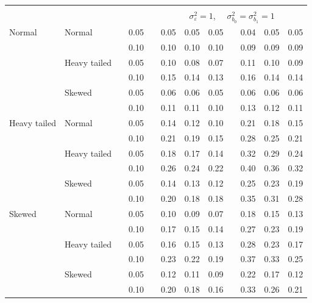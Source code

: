 \documentclass[12pt]{article} %
\begin{document}
\begin{table}[ht]
\begin{scriptsize}
\begin{center}
\begin{tabular}{ll p{.1cm} c p{.1cm} rrr p{.1cm} rrr}
&&&&&&&&&&&\\
& && && \multicolumn{7}{c}{$\sigma_{\varepsilon}^2 = 1$, \ \ $\sigma_{b_0}^2 = \sigma_{b_1}^2 = 1$} \\ \cline{6-12}
Normal       & Normal       && 0.05 &&  0.05 & 0.05 & 0.05 && 0.04 & 0.05 & 0.05 \\ 
             &              && 0.10 &&  0.10 & 0.10 & 0.10 && 0.09 & 0.09 & 0.09 \\ 
             & Heavy tailed && 0.05 &&  0.10 & 0.08 & 0.07 && 0.11 & 0.10 & 0.09 \\ 
             &              && 0.10 &&  0.15 & 0.14 & 0.13 && 0.16 & 0.14 & 0.14 \\ 
             & Skewed       && 0.05 &&  0.06 & 0.06 & 0.05 && 0.06 & 0.06 & 0.06 \\ 
             &              && 0.10 &&  0.11 & 0.11 & 0.10 && 0.13 & 0.12 & 0.11 \\ 
Heavy tailed & Normal       && 0.05 &&  0.14 & 0.12 & 0.10 && 0.21 & 0.18 & 0.15 \\ 
             &              && 0.10 &&  0.21 & 0.19 & 0.15 && 0.28 & 0.25 & 0.21 \\ 
             & Heavy tailed && 0.05 &&  0.18 & 0.17 & 0.14 && 0.32 & 0.29 & 0.24 \\ 
             &              && 0.10 &&  0.26 & 0.24 & 0.22 && 0.40 & 0.36 & 0.32 \\ 
             & Skewed       && 0.05 &&  0.14 & 0.13 & 0.12 && 0.25 & 0.23 & 0.19 \\ 
             &              && 0.10 &&  0.20 & 0.18 & 0.18 && 0.35 & 0.31 & 0.28 \\ 
Skewed       & Normal       && 0.05 &&  0.10 & 0.09 & 0.07 && 0.18 & 0.15 & 0.13 \\ 
             &              && 0.10 &&  0.17 & 0.15 & 0.14 && 0.27 & 0.23 & 0.19 \\ 
             & Heavy tailed && 0.05 &&  0.16 & 0.15 & 0.13 && 0.28 & 0.23 & 0.17 \\ 
             &              && 0.10 &&  0.23 & 0.22 & 0.19 && 0.37 & 0.33 & 0.25 \\ 
             & Skewed       && 0.05 &&  0.12 & 0.11 & 0.09 && 0.22 & 0.17 & 0.12 \\ 
             &              && 0.10 &&  0.20 & 0.18 & 0.16 && 0.33 & 0.26 & 0.21 \\ 



\end{tabular}
\end{center}
\end{scriptsize}
\end{table}
\end{document}
